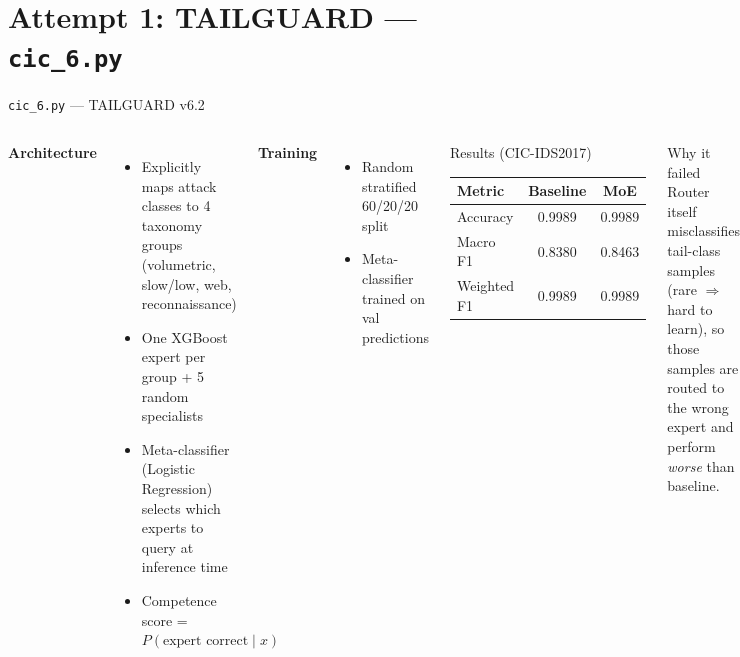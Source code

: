\documentclass[aspectratio=169,10pt]{beamer}
\begin{document}
\section{Attempt 1: TAILGUARD --- \texttt{cic\_6.py}}

\begin{frame}{\texttt{cic\_6.py} --- TAILGUARD v6.2}
  \begin{columns}[T]
      \textbf{Architecture}
      \begin{itemize}
        \item Explicitly maps attack classes to 4 taxonomy groups\\
              (volumetric, slow/low, web, reconnaissance)
        \item One XGBoost expert per group + 5 random specialists
        \item Meta-classifier (Logistic Regression) selects which experts
              to query at inference time
        \item Competence score = $P(\text{expert correct} \mid x)$
      \end{itemize}
      \vspace{6pt}
      \textbf{Training}
      \begin{itemize}
        \item Random stratified 60/20/20 split
        \item Meta-classifier trained on val predictions
      \end{itemize}
      \begin{block}{Results (CIC-IDS2017)}
        \footnotesize
        \begin{tabular}{lcc}
          \toprule
          Metric & Baseline & MoE \\
          \midrule
          Accuracy       & 0.9989 & 0.9989 \\
          Macro F1       & 0.8380 & 0.8463 \\
          Weighted F1    & 0.9989 & 0.9989 \\
          \bottomrule
        \end{tabular}
      \end{block}
      \vspace{6pt}
      \begin{alertblock}{Why it failed}
        Router itself misclassifies tail-class samples
        (rare $\Rightarrow$ hard to learn), so those samples are
        routed to the wrong expert and perform \emph{worse} than baseline.
      \end{alertblock}
  \end{columns}
\end{frame}
\end{document}
